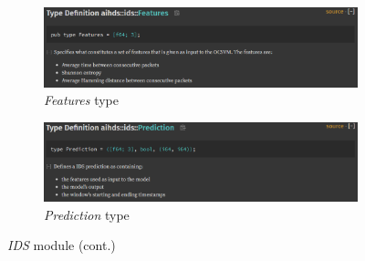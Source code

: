 \begin{figure}
    \ContinuedFloat
    \begin{subfigure}[b]{\linewidth}
        \includegraphics[width = \linewidth]{img/parts/docs/ids/ids_type_features.png}
        \caption{\emph{Features} type}
        \label{subfig:doc_ids_type_features}
    \end{subfigure}
    \begin{subfigure}[b]{\linewidth}
        \includegraphics[width = \linewidth]{img/parts/docs/ids/ids_type_prediction.png}
        \caption{\emph{Prediction} type}
        \label{subfig:doc_ids_type_prediction}
    \end{subfigure}
    \caption{\emph{IDS} module (cont.)}
    \label{fig:doc_ids}
\end{figure}

